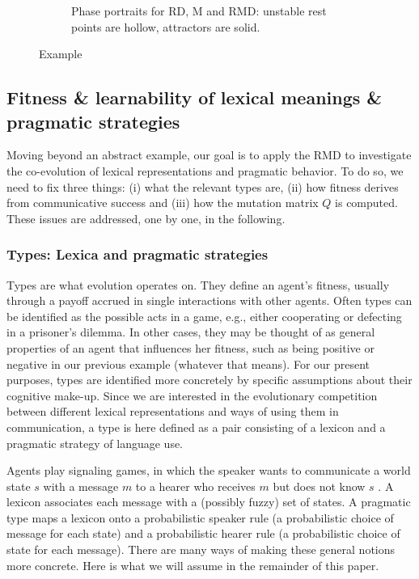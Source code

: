 \documentclass[a4paper, 11pt]{article}
\theoremstyle{Satz}
\begin{document}
\begin{figure}[t]
\begin{subfigure}[b]{0.5\textwidth}
        


    \caption{Phase portraits for RD, M and RMD: unstable rest points are hollow, attractors are
      solid.}
        \label{fig:Phase_RD}
    \end{subfigure}

  \caption{Example}
  \label{fig:Example_RMD}
\end{figure}


\subsection{Fitness \& learnability of lexical meanings \& pragmatic strategies}
\label{sec:fitn--learn}

Moving beyond an abstract example, our goal is to apply the RMD to investigate the co-evolution
of lexical representations and pragmatic behavior. To do so, we need to fix three things: (i) what the
relevant types are, (ii) how fitness derives from communicative success and (iii) how the
mutation matrix $Q$ is computed. These issues are addressed, one by one, in the following.

\subsubsection{Types: Lexica and pragmatic strategies}
\label{sec:languages+use}

Types are what evolution operates on. They define an agent's fitness, usually through a payoff
accrued in single interactions with other agents. Often types can be identified as the possible
acts in a game, e.g., either cooperating or defecting in a prisoner's dilemma. In other cases,
they may be thought of as general properties of an agent that influences her fitness, such as
being positive or negative in our previous example (whatever that means). For our present
purposes, types are identified more concretely by specific assumptions about their cognitive
make-up. Since we are interested in the evolutionary competition between different lexical
representations and ways of using them in communication, a type is here defined as a pair consisting
of a lexicon and a pragmatic strategy of language use.

Agents play signaling games, in which the speaker wants to communicate a world state $s$ with a
message $m$ to a hearer who receives $m$ but does not know $s$
\citep[e.g.][]{lewis:1969,Skyrms2010:Signals}. A lexicon associates each message with a
(possibly fuzzy) set of states. A pragmatic type maps a lexicon onto a probabilistic speaker
rule (a probabilistic choice of message for each state) and a probabilistic hearer rule (a
probabilistic choice of state for each message). There are many ways of making these general
notions more concrete. Here is what we will assume in the remainder of this paper.
\end{document}

